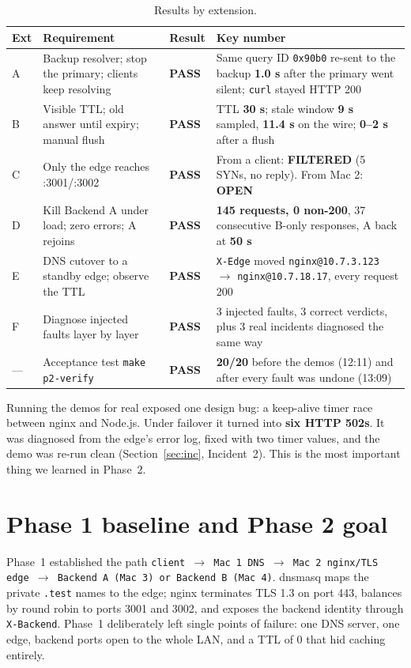 \documentclass[11pt,a4paper]{article}
\newcommand{\pass}{\textcolor{lmGreen}{\textbf{PASS}}}
\begin{document}
\begin{table}[H]
\centering
\caption{Results by extension.}
{\small
\begin{tabular}{@{}L{0.7cm}L{4.3cm}L{1.15cm}L{8.2cm}@{}}
\toprule
\textbf{Ext} & \textbf{Requirement} & \textbf{Result} & \textbf{Key number} \\
\midrule
A & Backup resolver; stop the primary; clients keep resolving & \pass & Same query ID \texttt{0x90b0} re-sent to the backup \textbf{1.0 s} after the primary went silent; \texttt{curl} stayed HTTP 200 \\
B & Visible TTL; old answer until expiry; manual flush & \pass & TTL \textbf{30 s}; stale window \textbf{9 s} sampled, \textbf{11.4 s} on the wire; \textbf{0--2 s} after a flush \\
C & Only the edge reaches :3001/:3002 & \pass & From a client: \textbf{FILTERED} (5 SYNs, no reply). From Mac 2: \textbf{OPEN} \\
D & Kill Backend A under load; zero errors; A rejoins & \pass & \textbf{145 requests, 0 non-200}, 37 consecutive B-only responses, A back at \textbf{50 s} \\
E & DNS cutover to a standby edge; observe the TTL & \pass & \texttt{X-Edge} moved \texttt{nginx@10.7.3.123} $\to$ \texttt{nginx@10.7.18.17}, every request 200 \\
F & Diagnose injected faults layer by layer & \pass & 3 injected faults, 3 correct verdicts, plus 3 real incidents diagnosed the same way \\
--- & Acceptance test \texttt{make p2-verify} & \pass & \textbf{20/20} before the demos (12:11) and after every fault was undone (13:09) \\
\bottomrule
\end{tabular}}
\end{table}

Running the demos for real exposed one design bug: a keep-alive timer race between nginx and
Node.js. Under failover it turned into \textbf{six HTTP 502s}. It was diagnosed from the edge's
error log, fixed with two timer values, and the demo was re-run clean (Section~\ref{sec:inc},
Incident~2). This is the most important thing we learned in Phase~2.

\section{Phase 1 baseline and Phase 2 goal}
Phase~1 established the path
\texttt{client $\to$ Mac 1 DNS $\to$ Mac 2 nginx/TLS edge $\to$ Backend A (Mac 3) or Backend B (Mac 4)}.
dnsmasq maps the private \texttt{.test} names to the edge; nginx terminates TLS 1.3 on port 443,
balances by round robin to ports 3001 and 3002, and exposes the backend identity through
\texttt{X-Backend}. Phase~1 deliberately left single points of failure: one DNS server, one
edge, backend ports open to the whole LAN, and a TTL of 0 that hid caching entirely.
\end{document}
